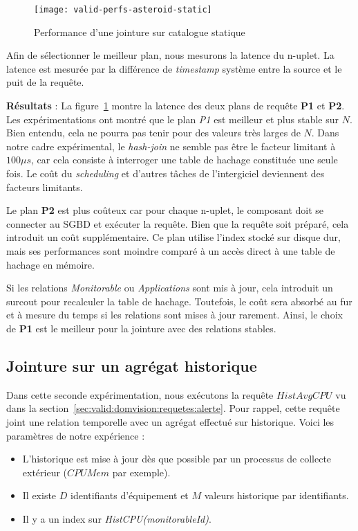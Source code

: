 \begin{figure}[ht]
	\centering
	\texttt{[image: valid-perfs-asteroid-static]}
	\caption{Performance d'une jointure sur catalogue statique}\label{fig:valid:perfs:asteroid:static}
\end{figure}

Afin de sélectionner le meilleur plan, nous mesurons la latence du n-uplet. La latence est mesurée par la différence de \textit{timestamp} système entre la source et le puit de la requête. 

\textbf{Résultats} : La figure~\ref{fig:valid:perfs:asteroid:static} montre la latence des deux plans de requête \textbf{P1} et \textbf{P2}. Les expérimentations ont montré que le plan \textit{P1} est meilleur et plus stable sur $N$. Bien entendu, cela ne pourra pas tenir pour des valeurs très larges de $N$. Dans notre cadre expérimental, le \textit{hash-join} ne semble pas être le facteur limitant à $100\mu s$, car cela consiste à interroger une table de hachage constituée une seule fois. Le coût du \textit{scheduling} et d'autres tâches de l'intergiciel deviennent des facteurs limitants. 

Le plan \textbf{P2} est plus coûteux car pour chaque n-uplet, le composant doit se connecter au SGBD et exécuter la requête. Bien que la requête soit préparé, cela introduit un coût supplémentaire. Ce plan utilise l'index stocké sur disque dur, mais ses performances sont moindre comparé à un accès direct à une table de hachage en mémoire.

Si les relations \textit{Monitorable} ou \textit{Applications} sont mis à jour, cela introduit un surcout pour recalculer la table de hachage. Toutefois, le coût sera absorbé au fur et à mesure du temps si les relations sont mises à jour rarement. Ainsi, le choix de \textbf{P1} est le meilleur pour la jointure avec des relations stables.

\subsection{Jointure sur un agrégat historique}
Dans cette seconde expérimentation, nous exécutons la requête $HistAvgCPU$ vu dans la section~\ref{sec:valid:domvision:requetes:alerte}. Pour rappel, cette requête joint une relation temporelle avec un agrégat effectué sur historique. Voici les paramètres de notre expérience :
\begin{itemize}
	\item L'historique est mise à jour dès que possible par un processus de collecte extérieur ($CPUMem$ par exemple).
	\item Il existe $D$ identifiants d'équipement et $M$ valeurs historique par identifiants.
	\item Il y a un index sur \textit{HistCPU(monitorableId)}.
\end{itemize}

